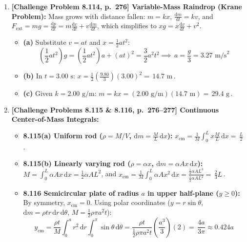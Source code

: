 \documentclass[11pt,a4paper,openany,oneside]{book}
\newcommand{\eqbox}[1]{\boxed{\,#1\,}}
\newcommand{\dd}{\,\mathrm{d}}
\newcommand{\diff}{\mathrm{d}}
\numberwithin{equation}{chapter}
\begin{document}
\begin{enumerate}[label=\textbf{Prob.\ \arabic*},leftmargin=4.2em]
  \item \textbf{[Challenge Problem 8.114, p.\ 276] Variable-Mass Raindrop (Krane Problem):}
  Mass grows with distance fallen: $m = kx$, $\frac{\diff m}{\diff t} = kv$, and $F_{\text{ext}} = mg = \frac{\diff p}{\diff t} = m\frac{\diff v}{\diff t} + v\frac{\diff m}{\diff t}$, which simplifies to $xg = x\frac{\diff v}{\diff t} + v^2$.
  \begin{itemize}
    \item \textbf{(a)} Substitute $v = at$ and $x = \frac{1}{2}at^2$:
    \begin{equation*}
      \left(\frac{1}{2}at^2\right)g = \left(\frac{1}{2}at^2\right)a + (at)^2 = \frac{3}{2}a^2 t^2 \implies \eqbox{a = \frac{g}{3} = 3.27\text{ m/s}^2}
    \end{equation*}
    \item \textbf{(b)} In $t = 3.00\text{ s}$: $x = \frac{1}{2}\!\left(\frac{9.80}{3}\right)(3.00)^2 = \eqbox{14.7\text{ m}}$.
    \item \textbf{(c)} Given $k = 2.00\text{ g/m}$: $m = kx = (2.00\text{ g/m})(14.7\text{ m}) = \eqbox{29.4\text{ g}}$.
  \end{itemize}

  \item \textbf{[Challenge Problems 8.115 \& 8.116, p.\ 276--277] Continuous Center-of-Mass Integrals:}
  \begin{itemize}
    \item \textbf{8.115(a) Uniform rod ($\rho = M/V$, $\diff m = \frac{M}{L}\dd x$):} $x_{\text{cm}} = \frac{1}{M}\int_0^L x\frac{M}{L}\dd x = \eqbox{\frac{L}{2}}$.
    \item \textbf{8.115(b) Linearly varying rod ($\rho = \alpha x$, $\diff m = \alpha A x\dd x$):} $M = \int_0^L \alpha A x\dd x = \frac{1}{2}\alpha A L^2$, and $x_{\text{cm}} = \frac{1}{M}\int_0^L \alpha A x^2\dd x = \frac{\frac{1}{3}\alpha A L^3}{\frac{1}{2}\alpha A L^2} = \eqbox{\frac{2}{3}L}$.
    \item \textbf{8.116 Semicircular plate of radius $a$ in upper half-plane ($y\ge 0$):} By symmetry, $x_{\text{cm}} = 0$. Using polar coordinates ($y = r\sin\theta$, $\diff m = \rho t r\dd r\dd\theta$, $M = \frac{1}{2}\rho\pi a^2 t$):
    \begin{equation*}
      y_{\text{cm}} = \frac{\rho t}{M}\int_0^a r^2\dd r \int_0^\pi \sin\theta\dd\theta = \frac{\rho t}{\frac{1}{2}\rho\pi a^2 t}\!\left(\frac{a^3}{3}\right)(2) = \eqbox{\frac{4a}{3\pi} \approx 0.424a}
    \end{equation*}
  \end{itemize}
\end{enumerate}
\end{document}
